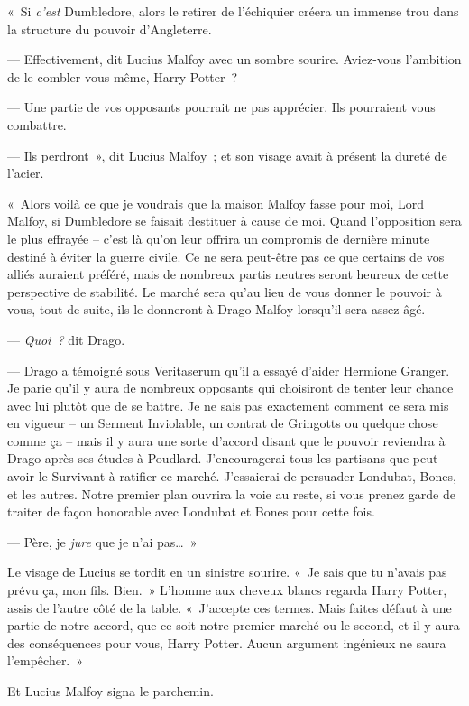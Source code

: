 «~Si \emph{c'est} Dumbledore, alors le retirer de l'échiquier créera un immense trou dans la structure du pouvoir d'Angleterre.

--- Effectivement, dit Lucius Malfoy avec un sombre sourire.
Aviez-vous l'ambition de le combler vous-même, Harry Potter~?

--- Une partie de vos opposants pourrait ne pas apprécier.
Ils pourraient vous combattre.

--- Ils perdront~», dit Lucius Malfoy~; et son visage avait à présent la dureté de l'acier.

«~Alors voilà ce que je voudrais que la maison Malfoy fasse pour moi, Lord Malfoy, si Dumbledore se faisait destituer à cause de moi.
Quand l'opposition sera le plus effrayée -- c'est là qu'on leur offrira un compromis de dernière minute destiné à éviter la guerre civile.
Ce ne sera peut-être pas ce que certains de vos alliés auraient préféré, mais de nombreux partis neutres seront heureux de cette perspective de stabilité.
Le marché sera qu'au lieu de vous donner le pouvoir à vous, tout de suite, ils le donneront à Drago Malfoy lorsqu'il sera assez âgé.

--- \emph{Quoi~?} dit Drago.

--- Drago a témoigné sous Veritaserum qu'il a essayé d'aider Hermione Granger.
Je parie qu'il y aura de nombreux opposants qui choisiront de tenter leur chance avec lui plutôt que de se battre.
Je ne sais pas exactement comment ce sera mis en vigueur -- un Serment Inviolable, un contrat de Gringotts ou quelque chose comme ça -- mais il y aura une sorte d'accord disant que le pouvoir reviendra à Drago après ses études à Poudlard.
J'encouragerai tous les partisans que peut avoir le Survivant à ratifier ce marché.
J'essaierai de persuader Londubat, Bones, et les autres.
Notre premier plan ouvrira la voie au reste, si vous prenez garde de traiter de façon honorable avec Londubat et Bones pour cette fois.

--- Père, je \emph{jure} que je n'ai pas…~»

Le visage de Lucius se tordit en un sinistre sourire.
«~Je sais que tu n'avais pas prévu ça, mon fils.
Bien.~» L'homme aux cheveux blancs regarda Harry Potter, assis de l'autre côté de la table.
«~J'accepte ces termes.
Mais faites défaut à une partie de notre accord, que ce soit notre premier marché ou le second, et il y aura des conséquences pour vous, Harry Potter.
Aucun argument ingénieux ne saura l'empêcher.~»

Et Lucius Malfoy signa le parchemin.

